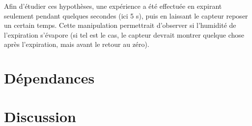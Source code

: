 Afin d'étudier ces hypothèses, une expérience a été effectuée en expirant seulement pendant quelques secondes (ici 5 s), puis en laissant le 
capteur reposer un certain temps. Cette manipulation permettrait d'observer si l'humidité de l'expiration s'évapore (si tel est le cas, le 
capteur devrait montrer quelque chose après l'expiration, mais avant le retour au zéro). 

\section{Dépendances}
\section{Discussion}
